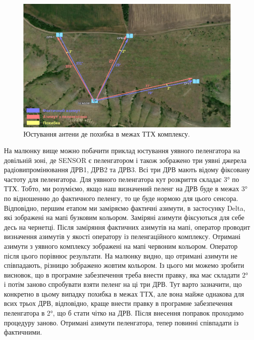 \documentclass{article}
\begin{document}
\begin{figure}[H]
	\centering
	\includegraphics[width=0.9\linewidth]{images/adjustments_ideal.png}
	\caption{\label{fig:tsi} Юстування антени де похибка в межах ТТХ комплексу.}
\end{figure}

На малюнку вище можно побачити приклад юстування уявного пеленгатора на довільній зоні, де SENSOR є пеленгатором і також зображено три уявні джерела радіовипромінювання ДРВ1, ДРВ2 та ДРВ3. Всі три ДРВ мають відому фіксовану частоту для пеленгатора. Для уявного пеленгатора кут розкриття складає 3° по ТТХ. Тобто, ми розуміємо, якщо наш визначений пеленг на ДРВ буде в межах 3° по відношенню до фактичного пеленгу, то це буде нормою для цього сенсора. Відповідно, першим етапом ми заміряємо фактичні азимути, в застосунку Delta, які зображені на мапі бузковим кольором. Заміряні азимути фіксуються для себе десь на чернетці. Після заміряння фактичних азимутів на мапі, оператор проводит визначення азимутів у якості оператору із пеленгаційного комплексу. Отримані азимути з уявного комплексу зображені на мапі червоним кольором. Оператор після цього порівнює результати. На малюнку видно, що отримані азимути не співпадають, різницю зображено жовтим кольором. Із цього ми можемо зробити висновок, що в програмне забезпечення треба внести правку, яка має складати 2° і потім заново спробувати взяти пеленг на ці три ДРВ. Тут варто зазначити, що конкретно в цьому випадку похибка в межах ТТХ, але вона майже однакова для всих трьох ДРВ, відповідно, краще внести правку в програмне забезпечення пеленгатора в 2°, що б стати чітко на ДРВ. Після внесення поправок проходимо процедуру заново. Отримані азимути пеленгатора, тепер повинні співпадати із фактичними.
\end{document}
